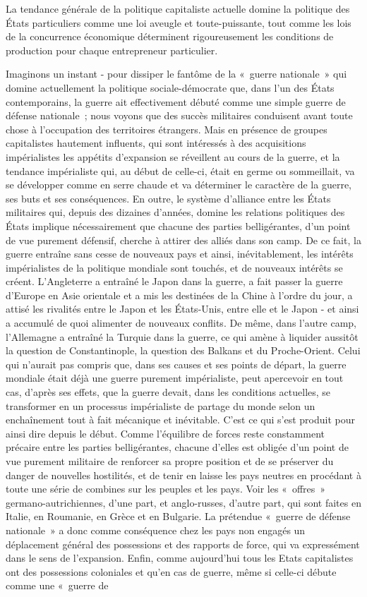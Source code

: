 \documentclass[french,twoside]{book} %
\begin{document}
La tendance générale de la politique capitaliste actuelle domine la politique des États particuliers comme une loi aveugle et toute-puissante, tout comme les lois de la concurrence économique déterminent rigoureusement les conditions de production pour chaque entrepreneur particulier.\par
Imaginons un instant - pour dissiper le fantôme de la « guerre nationale » qui domine actuellement la politique sociale-démocrate que, dans l’un des États contemporains, la guerre ait effectivement débuté comme une simple guerre de défense nationale ; nous voyons que des succès militaires conduisent avant toute chose à l’occupation des territoires étrangers. Mais en présence de groupes capitalistes hautement influents, qui sont intéressés à des acquisitions impérialistes les appétits d’expansion se réveillent au cours de la guerre, et la tendance impérialiste qui, au début de celle-ci, était en germe ou sommeillait, va se développer comme en serre chaude et va déterminer le caractère de la guerre, ses buts et ses conséquences. En outre, le système d’alliance entre les États militaires qui, depuis des dizaines d’années, domine les relations politiques des États implique nécessairement que chacune des parties belligérantes, d’un point de vue purement défensif, cherche à attirer des alliés dans son camp. De ce fait, la guerre entraîne sans cesse de nouveaux pays et ainsi, inévitablement, les intérêts impérialistes de la politique mondiale sont touchés, et de nouveaux intérêts se créent. L'Angleterre a entraîné le Japon dans la guerre, a fait passer la guerre d’Europe en Asie orientale et a mis les destinées de la Chine à l’ordre du jour, a attisé les rivalités entre le Japon et les États-Unis, entre elle et le Japon - et ainsi a accumulé de quoi alimenter de nouveaux conflits. De même, dans l’autre camp, l’Allemagne a entraîné la Turquie dans la guerre, ce qui  amène à liquider aussitôt la question de Constantinople, la question des Balkans et du Proche-Orient. Celui qui n’aurait pas compris que, dans ses causes et ses points de départ, la guerre mondiale était déjà une guerre purement impérialiste, peut apercevoir en tout cas, d’après ses effets, que la guerre devait, dans les conditions actuelles, se transformer en un processus impérialiste de partage du monde selon un enchaînement tout à fait mécanique et inévitable. C'est ce qui s’est produit pour ainsi dire depuis le début. Comme l’équilibre de forces reste constamment précaire entre les parties belligérantes, chacune d’elles est obligée d’un point de vue purement militaire de renforcer sa propre position et de se préserver du danger de nouvelles hostilités, et de tenir en laisse les pays neutres en procédant à toute une série de combines sur les peuples et les pays. Voir les « offres » germano-autrichiennes, d’une part, et anglo-russes, d’autre part, qui sont faites en Italie, en Roumanie, en Grèce et en Bulgarie. La prétendue « guerre de défense nationale » a donc comme conséquence chez les pays non engagés un déplacement général des possessions et des rapports de force, qui va expressément dans le sens de l’expansion. Enfin, comme aujourd’hui tous les Etats capitalistes ont des possessions coloniales et qu’en cas de guerre, même si celle-ci débute comme une « guerre de 
\end{document}
